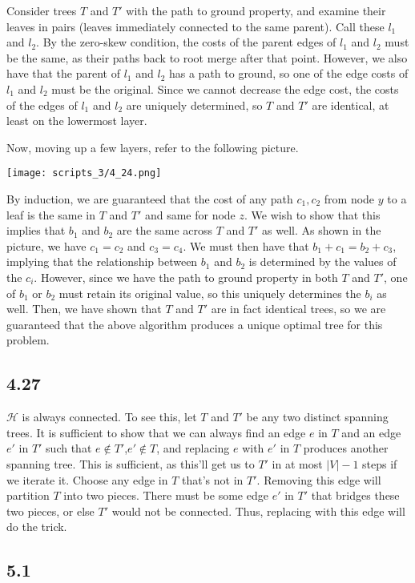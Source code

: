 \documentclass{article}
\begin{document}
Consider trees $T$ and $T'$ with the path to ground property, and examine their leaves in pairs (leaves immediately connected to the same parent). Call these $l_1$ and $l_2$. By the zero-skew condition, the costs of the parent edges of $l_1$ and $l_2$ must be the same, as their paths back to root merge after that point. However, we also have that the parent of $l_1$ and $l_2$ has a path to ground, so one of the edge costs of $l_1$ and $l_2$ must be the original. Since we cannot decrease the edge cost, the costs of the edges of $l_1$ and $l_2$ are uniquely determined, so $T$ and $T'$ are identical, at least on the lowermost layer.

Now, moving up a few layers, refer to the following picture.

\texttt{[image: scripts\_3/4\_24.png]}

By induction, we are guaranteed that the cost of any path $c_1,c_2$ from node $y$ to a leaf is the same in $T$ and $T'$ and same for node $z$. We wish to show that this implies that $b_1$ and $b_2$ are the same across $T$ and $T'$ as well. As shown in the picture, we have $c_1=c_2$ and $c_3=c_4$. We must then have that $b_1+c_1=b_2+c_3$, implying that the relationship between $b_1$ and $b_2$ is determined by the values of the $c_i$. However, since we have the path to ground property in both $T$ and $T'$, one of $b_1$ or $b_2$ must retain its original value, so this uniquely determines the $b_i$ as well. Then, we have shown that $T$ and $T'$ are in fact identical trees, so we are guaranteed that the above algorithm produces a unique optimal tree for this problem.

\subsection*{4.27}
$\mathcal{H}$ is always connected. To see this, let $T$ and $T'$ be any two distinct spanning trees. It is sufficient to show that we can always find an edge $e$ in $T$ and an edge $e'$ in $T'$ such that $e\not\in T'$,$e'\not\in T$, and replacing $e$ with $e'$ in $T$ produces another spanning tree. This is sufficient, as this'll get us to $T'$ in at most $|V|-1$ steps if we iterate it. Choose any edge in $T$ that's not in $T'$. Removing this edge will partition $T$ into two pieces. There must be some edge $e'$ in $T'$ that bridges these two pieces, or else $T'$ would not be connected. Thus, replacing with this edge will do the trick.

\subsection*{5.1}
\end{document}
